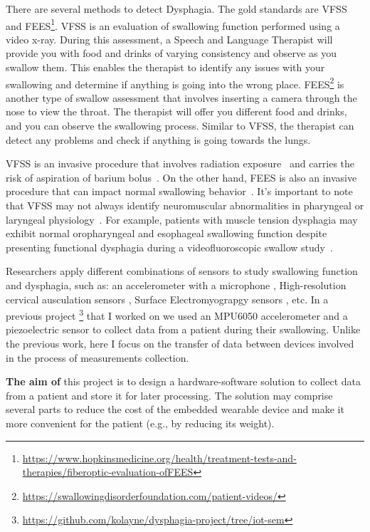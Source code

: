 \documentclass[lettersize,journal]{IEEEtran}
\begin{document}
There are several methods to detect Dysphagia. The gold standards are \gls{VFSS} and \gls{FEES}\footnote{\url{https://www.hopkinsmedicine.org/health/treatment-tests-and-therapies/fiberoptic-evaluation-ofFEES}}. \gls{VFSS} is an evaluation of swallowing function performed using a video x-ray. During this assessment, a Speech and Language Therapist will provide you with food and drinks of varying consistency and observe as you swallow them. This enables the therapist to identify any issues with your swallowing and determine if anything is going into the wrong place. \gls{FEES}\footnote{\url{https://swallowingdisorderfoundation.com/patient-videos/}} is another type of swallow assessment that involves inserting a camera through the nose to view the throat. The therapist will offer you different food and drinks, and you can observe the swallowing process. Similar to \gls{VFSS}, the therapist can detect any problems and check if anything is going towards the lungs.


\gls{VFSS} is an invasive procedure that involves radiation exposure~\cite{morishima2016estimation} and carries the risk of aspiration of barium bolus~\cite{iizuka2018new}. On the other hand, \gls{FEES} is also an invasive procedure that can impact normal swallowing behavior~\cite{hiss2003fiberoptic}. It's important to note that VFSS may not always identify neuromuscular abnormalities in pharyngeal or laryngeal physiology~\cite{vaiman2007standardization}. For example, patients with muscle tension dysphagia may exhibit normal oropharyngeal and esophageal swallowing function despite presenting functional dysphagia during a videofluoroscopic swallow study~\cite{kang2016muscle,krasnodkebska2021diagnosis}.


Researchers apply different combinations of sensors to study swallowing function
and dysphagia, such as: an accelerometer with a microphone \cite{dudik2015accelsound},
High-resolution cervical ausculation sensors \cite{donohue2022kinematic},
Surface Electromyograpgy sensors \cite{yelin2022semg}, etc.
In a previous project
\footnote{\url{https://github.com/kolayne/dysphagia-project/tree/iot-sem}}
that I worked on we used an MPU6050 accelerometer
and a piezoelectric sensor to collect data from a patient during their swallowing. Unlike the previous work, here
I focus on the transfer of data between devices involved in the process of
measurements collection.

\textbf{The aim of} this project is to design a hardware-software solution to collect
data from a patient and store it for later processing. The solution may comprise
several parts to reduce the cost of the embedded wearable device and make it more
convenient for the patient (e.g., by reducing its weight).
\end{document}
